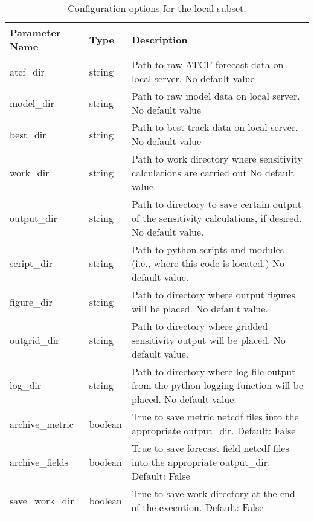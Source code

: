 \documentclass[psfig,12pt]{article}
\begin{document}
\begin{table}[H]
\caption{Configuration options for the local subset.}
\begin{center}
\begin{tabular}{|p{1.60in}|p{0.5in}|p{4.15in}|}
\hline
Parameter Name & Type & Description \\ \hline\hline
atcf\_dir & string & Path to raw ATCF forecast data on local server.  No default value \\ \hline
model\_dir & string & Path to raw model data on local server.  No default value \\ \hline
best\_dir & string & Path to best track data on local server.  No default value \\ \hline
work\_dir & string & Path to work directory where sensitivity calculations are carried out
No default value. \\ \hline
output\_dir & string & Path to directory to save certain output of the sensitivity 
calculations, if desired.  No default value.  \\ \hline
script\_dir & string & Path to python scripts and modules (i.e., where this code is located.)
No default value. \\ \hline
figure\_dir & string & Path to directory where output figures will be placed.
No default value.  \\ \hline
outgrid\_dir & string & Path to directory where gridded sensitivity output will be placed.
No default value.  \\ \hline
log\_dir & string & Path to directory where log file output from the python logging function
will be placed.  No default value. \\ \hline
archive\_metric & boolean & True to save metric netcdf files into the appropriate 
output\_dir.  Default: False \\ \hline
archive\_fields & boolean & True to save forecast field netcdf files into the appropriate
output\_dir.  Default: False \\ \hline
save\_work\_dir & boolean & True to save work directory at the end of the execution.
Default:  False \\ \hline

\end{tabular}
\end{center}
\end{table}
\end{document}
